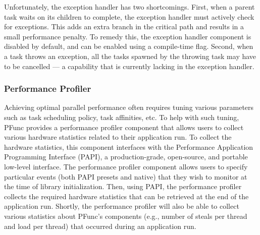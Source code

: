 Unfortunately, the exception handler has two shortcomings. 
%
First, when a parent task waits on its children to complete, the exception 
handler must actively check for exceptions.
%
This adds an extra branch in the critical path and results in a small
performance penalty.
%
To remedy this, the exception handler component is disabled by default, and 
can be enabled using a compile-time flag.
%
Second, when a task throws an exception, all the tasks spawned by the throwing
task may have to be cancelled --- a capability that is currently
lacking in the exception handler.

\subsubsection{Performance Profiler}
\label{subsubsec:performance_profiler}

Achieving optimal parallel performance often requires tuning various parameters
such as task scheduling policy, task affinities, etc.
%
To help with such tuning, PFunc provides a performance profiler component that
allows users to collect various hardware statistics related to their
application run.
%
To collect the hardware statistics, this component interfaces with the
Performance Application Programming Interface (PAPI), a production-grade,
open-source, and portable low-level interface.
%
The performance profiler component allows users to specify particular events
(both PAPI presets and native) that they wish to monitor at the time of library
initialization.
%
Then, using PAPI, the performance profiler collects the required hardware 
statistics that can be retrieved at the end of the application run.
%
Shortly, the performance profiler will also be able to collect various
statistics about PFunc's components (e.g., number of steals per thread and load
per thread) that occurred during an application run.
%
